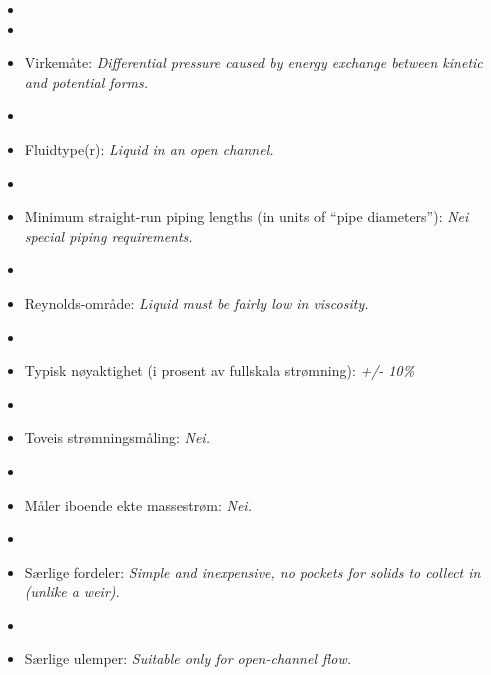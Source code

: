 \begin{itemize}
\goodbreak
\item{} 
\vskip 5pt
\item\item{} Virkemåte: {\it Differential pressure caused by energy exchange between kinetic and potential forms.}
\vskip 5pt
\item\item{} Fluidtype(r): {\it Liquid in an open channel.}
\vskip 5pt
\item\item{} Minimum straight-run piping lengths (in units of ``pipe diameters''): {\it Nei special piping requirements.}
\vskip 5pt
\item\item{} Reynolds-område: {\it Liquid must be fairly low in viscosity.}
\vskip 5pt
\item\item{} Typisk nøyaktighet (i prosent av fullskala strømning): {\it +/- 10\%}
\vskip 5pt
\item\item{} Toveis strømningsmåling: {\it Nei.}
\vskip 5pt
\item\item{} Måler iboende ekte massestrøm: {\it Nei.}
\vskip 5pt
\item\item{} Særlige fordeler: {\it Simple and inexpensive, no pockets for solids to collect in (unlike a weir).}
\vskip 5pt
\item\item{} Særlige ulemper: {\it Suitable only for open-channel flow.}
\end{itemize}










